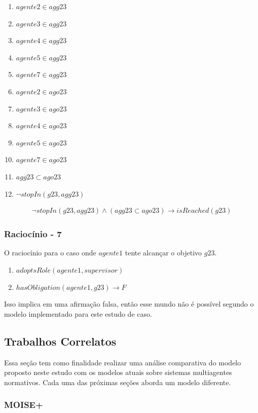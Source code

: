 \documentclass[12pt]{article}
\begin{document}
\begin{enumerate}
	\item $agente2 \in agg23$	
	\item $agente3 \in agg23$
	\item $agente4 \in agg23$
	\item $agente5 \in agg23$
	\item $agente7 \in agg23$								
	\item $agente2 \in ago23$	
	\item $agente3 \in ago23$
	\item $agente4 \in ago23$
	\item $agente5 \in ago23$
	\item $agente7 \in ago23$	
	\item $agg23 \subset ago23$
	\item $\neg stopIn(g23,agg23)$										
\end{enumerate}

\begin{eqnarray}\label{rel15}
	\neg stopIn(g23,agg23) \wedge (agg23 \subset ago23) \to isReached(g23)
\end{eqnarray}

\subsubsection{Raciocínio - 7}

O raciocínio para o caso onde $agente1$ tente alcançar o objetivo $g23$.  

\begin{enumerate}
	\item $adoptsRole(agente1,supervisor)$
	\item $hasObligation(agente1,g23) \to F$										
\end{enumerate}

Isso implica em uma afirmação falsa, então esse mundo não é possível segundo o modelo implementado para este estudo de caso.

\subsection{Trabalhos Correlatos}

Essa seção tem como finalidade realizar uma análise comparativa do modelo proposto neste estudo com os modelos atuais sobre sistemas multiagentes normativos. Cada uma das próximas seções aborda um modelo diferente.

\subsubsection{MOISE+}
\end{document}
